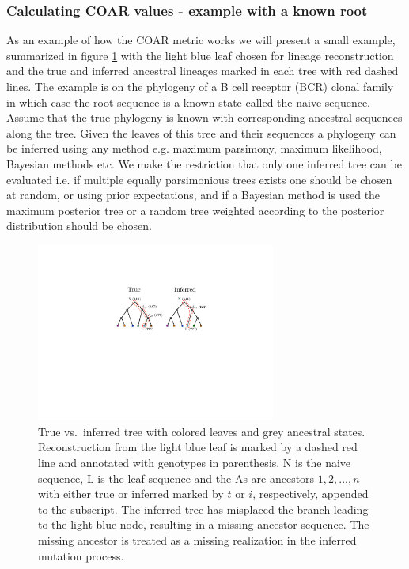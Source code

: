 \subsubsection{Calculating COAR values - example with a known root}
As an example of how the COAR metric works we will present a small example, summarized in figure \ref{fig:ASR_true_vs_inferred} with the light blue leaf chosen for lineage reconstruction and the true and inferred ancestral lineages marked in each tree with red dashed lines.
The example is on the phylogeny of a B cell receptor (BCR) clonal family in which case the root sequence is a known state called the naive sequence.
Assume that the true phylogeny is known with corresponding ancestral sequences along the tree.
Given the leaves of this tree and their sequences a phylogeny can be inferred using any method e.g. maximum parsimony, maximum likelihood, Bayesian methods etc.
We make the restriction that only one inferred tree can be evaluated i.e. if multiple equally parsimonious trees exists one should be chosen at random, or using prior expectations, and if a Bayesian method is used the maximum posterior tree or a random tree weighted according to the posterior distribution should be chosen.

\begin{figure}[ht!]
    \centering
    \includegraphics[width=0.7\textwidth]{figures/ASR_true_vs_inferred.pdf}
    \caption{
        \label{fig:ASR_true_vs_inferred}
        True vs.\ inferred tree with colored leaves and grey ancestral states. Reconstruction from the light blue leaf is marked by a dashed red line and annotated with genotypes in parenthesis. N is the naive sequence, L is the leaf sequence and the As are ancestors $1,2,...,n$ with either true or inferred marked by $t$ or $i$, respectively, appended to the subscript. The inferred tree has misplaced the branch leading to the light blue node, resulting in a missing ancestor sequence. The missing ancestor is treated as a missing realization in the inferred mutation process.
    }
\end{figure}

